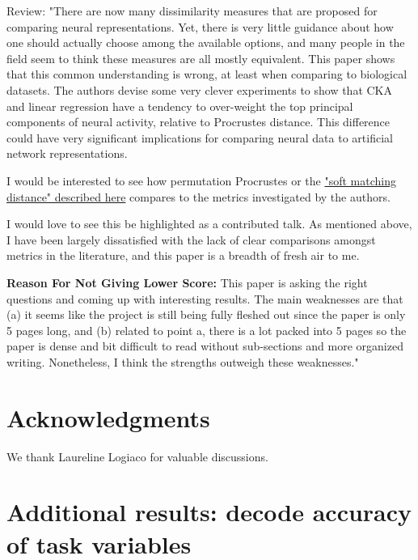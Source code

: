 \documentclass{article} %
\newcommand{\beginsupplement}{%
        \setcounter{table}{0}
        \renewcommand{\thetable}{S\arabic{table}}
        \renewcommand{\theHtable}{S\arabic{table}}
        \setcounter{figure}{0}
        \renewcommand{\thefigure}{S\arabic{figure}}%
        \renewcommand{\theHfigure}{S\arabic{figure}}
}
\begin{document}
Review:
"There are now many dissimilarity measures that are proposed for comparing neural representations. Yet, there is very little guidance about how one should actually choose among the available options, and many people in the field seem to think these measures are all mostly equivalent. This paper shows that this common understanding is wrong, at least when comparing to biological datasets. The authors devise some very clever experiments to show that CKA and linear regression have a tendency to over-weight the top principal components of neural activity, relative to Procrustes distance. This difference could have very significant implications for comparing neural data to artificial network representations.

I would be interested to see how permutation Procrustes or the \href{https://arxiv.org/abs/2311.09466}{"soft matching distance" described here} compares to the metrics investigated by the authors.

I would love to see this be highlighted as a contributed talk. As mentioned above, I have been largely dissatisfied with the lack of clear comparisons amongst metrics in the literature, and this paper is a breadth of fresh air to me.

\textbf{Reason For Not Giving Lower Score:} This paper is asking the right questions and coming up with interesting results. The main weaknesses are that (a) it seems like the project is still being fully fleshed out since the paper is only 5 pages long, and (b) related to point a, there is a lot packed into 5 pages so the paper is dense and bit difficult to read without sub-sections and more organized writing. Nonetheless, I think the strengths outweigh these weaknesses."
\fi%


\section{Acknowledgments}
We thank Laureline Logiaco %
for valuable discussions.
\clearpage







% 
% 



\appendix


\newpage
\beginsupplement

\section{Additional results: decode accuracy of task variables} \label{appendix:additional_results}
\end{document}
